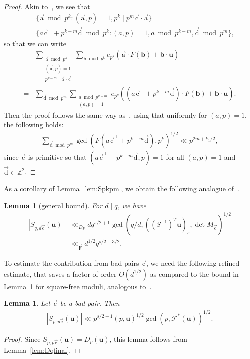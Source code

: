\documentclass[letterpaper,11pt]{amsart}
\numberwithin{equation}{section}
\newtheorem{lemma}[theorem]{Lemma}
\theoremstyle{definition}
\numberwithin{equation}{section}
\newcommand{\ZZ}{\mathbb{Z}}
\newcommand{\uu}{\mathbf{u}}
\newcommand{\bb}{\mathbf{b}}
\newcommand{\ua}{\vec{\mathrm{a}}}
\newcommand{\uF}{{\vec{\mathrm{F}} }}
\newcommand{\uc}{{\vec{\mathrm{c}}}}
\newcommand{\ud}{\vec{\mathrm{d}}}
\def\scrF{{\mathcal F}}
\newcommand{\nF}{\uF}
\begin{document}
\begin{proof}
	Akin to~\cite[Lemma 3.3]{V19}, we see that 
	\begin{align*}
	&\{\ua \bmod {p^k}:(\ua, p)=1, p^{k}\mid p^{m}\uc \cdot \ua \}\\ =&\{a\uc^\perp +p^{k-m}\ud\bmod {p^k}: (a, p)=1, a\bmod p^{k-m}, \ud \bmod{p^m} \},
	\end{align*}
	so that we can write \begin{align*}
	&\sum_{\substack{\ua \bmod {p^k}\\ (\ua, p)=1\\ p^{k-m}\mid \ua \cdot \uc }}\sum_{\bb \bmod {p^k}}e_{p^k}(\ua \cdot F(\bb)+\bb \cdot \uu)\\=&\sum_{\ud \bmod {p^{m}}} \sum_{\substack{a\bmod {p^{k-m}}\\ (a,p)=1}}e_{p^k}((a\uc^\perp +p^{k-m}\ud )\cdot F(\bb)+\bb\cdot \uu).
	\end{align*}
	Then the proof follows the same way as~\cite[Lemma 6.7]{V19}, using that uniformly for $(a, p)=1$, the following holds:
	\begin{align*}
	\sum_{\ud \bmod {p^{m}}}\operatorname{gcd}(F(a\uc^\perp+p^{k-m}\ud ), p^k)^{1/2}\ll p^{2m+k_1/2},
	\end{align*}
since $\uc$ is primitive so that  $(a\uc^\perp+p^{k-m}\ud, p)=1$ for all $(a, p)=1$ and $\ud\in \ZZ^2$.
\end{proof}
As a corollary of Lemma~\ref{lem:Spkpm}, we obtain the following analogue of~\cite[Lemma 6.8]{V19}.
\begin{lemma}[general bound]\label{weakbound} For $d\mid q$, we have
	\begin{align*}
	|S_{q, d\uc}( \uu)|&\ll_{D_F}dq^{s/2+1}\gcd(q/d, ((S^{-1})^T\uu)_s, \det M_{\uc})^{1/2}\\&\ll_{\nF} d^{1/2}q^{s/2+3/2}.
		\end{align*}
\end{lemma}
To estimate the contribution from bad pairs $\uc$, we need the following refined estimate, that saves a factor of order $O(d^{1/2})$ as compared to the bound in Lemma~\ref{weakbound} for square-free moduli, analogous to~\cite[Lemma 6.5]{V19}.
\begin{lemma}\label{badpairgoodp}
	Let $\uc$ be a bad pair. Then
	\begin{align*}
	|S_{p, p\uc}(\uu)|\ll p^{s/2+1}(p,\uu)^{1/2}\gcd(p, \scrF^*(\uu))^{1/2}.
	\end{align*}
\end{lemma}
\begin{proof}
Since
$S_{p,p\uc}(\uu)=D_p(\uu)$, this lemma follows from Lemma~\ref{lem:Dqfinal}.
\end{proof}
\end{document}
